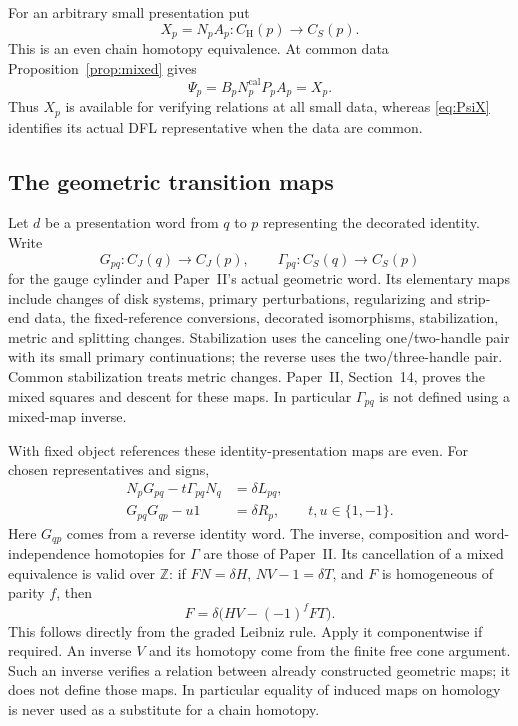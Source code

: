 \documentclass[11pt]{amsart}
\theoremstyle{definition}
\theoremstyle{remark}
\theoremstyle{plain}
\newcommand{\ZZ}{\mathbb Z}
\newcommand{\calib}{\mathrm{cal}}
\newcommand{\CH}{C_{\mathrm H}}
\newcommand{\CJ}{C_J}
\newcommand{\CS}{C_S}
\begin{document}
For an arbitrary small presentation put
\begin{equation}\label{eq:X}
 X_p=N_pA_p:\CH(p)\longrightarrow\CS(p).
\end{equation}
This is an even chain homotopy equivalence. At common data
Proposition~\ref{prop:mixed} gives
\begin{equation}\label{eq:PsiX}
 \Psi_p=B_pN_p^{\calib}P_pA_p=X_p.
\end{equation}
Thus $X_p$ is available for verifying relations at all small
data, whereas \eqref{eq:PsiX} identifies its actual DFL
representative when the data are common.

\subsection{The geometric transition maps}
Let $d$ be a presentation word from $q$ to $p$ representing
the decorated identity. Write
\[
 G_{pq}:\CJ(q)\longrightarrow\CJ(p),\qquad
 \Gamma_{pq}:\CS(q)\longrightarrow\CS(p)
\]
for the gauge cylinder and Paper~II's actual geometric word.
Its elementary maps include changes of disk systems, primary
perturbations, regularizing and strip-end data, the fixed-reference
conversions, decorated isomorphisms, stabilization, metric and
splitting changes. Stabilization uses the canceling one/two-handle
pair with its small primary continuations; the reverse uses the
two/three-handle pair. Common stabilization treats metric changes.
Paper~II, Section~14, proves the mixed squares and descent for
these maps. In particular $\Gamma_{pq}$ is not defined using a
mixed-map inverse.

With fixed object references these identity-presentation maps
are even. For chosen representatives and signs,
\begin{align}
 N_pG_{pq}-t\Gamma_{pq}N_q&=\delta L_{pq},\label{eq:transition}\\
 G_{pq}G_{qp}-u1&=\delta R_p,\qquad t,u\in\{1,-1\}.
 \label{eq:reverse}
\end{align}
Here $G_{qp}$ comes from a reverse identity word. The inverse,
composition and word-independence homotopies for $\Gamma$ are
those of Paper~II. Its cancellation of a mixed equivalence is
valid over $\ZZ$: if $FN=\delta H$, $NV-1=\delta T$, and $F$
is homogeneous of parity $f$, then
\begin{equation}\label{eq:cancel}
 F=\delta\bigl(HV-(-1)^fFT\bigr).
\end{equation}
This follows directly from the graded Leibniz rule. Apply it
componentwise if required. An inverse $V$ and its homotopy come
from the finite free cone argument. Such an inverse verifies a
relation between already constructed geometric maps; it does
not define those maps. In particular equality of induced maps
on homology is never used as a substitute for a chain homotopy.
\end{document}
